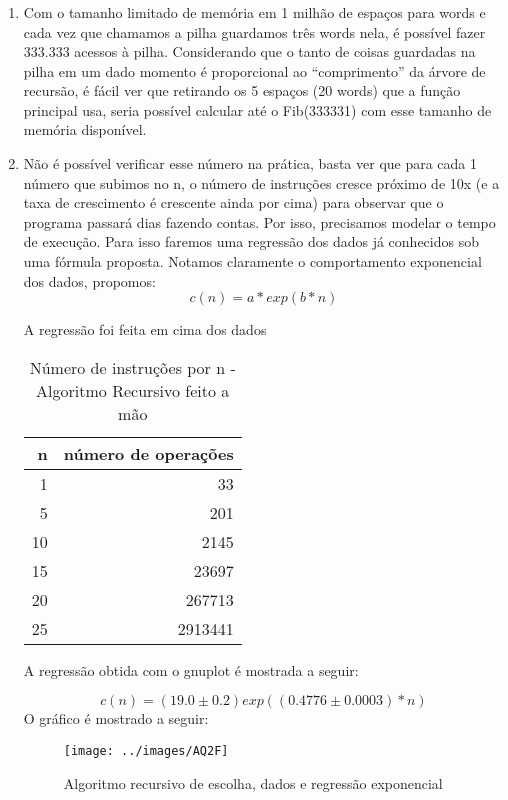         \subsubsection{}
        \begin{enumerate}
        \item Com o tamanho limitado de memória em 1 milhão de espaços para words e cada vez que chamamos a pilha guardamos três words nela, é possível fazer 333.333 acessos à pilha. Considerando que o tanto de coisas guardadas na pilha em um dado momento é proporcional ao “comprimento” da árvore de recursão, é fácil ver que retirando os 5 espaços (20 words) que a função principal usa, seria possível calcular até o Fib(333331) com esse tamanho de memória disponível.
        
        \item Não é possível verificar esse número na prática, basta ver que para cada 1 número que subimos no n, o número de instruções cresce próximo de 10x (e a taxa de crescimento é crescente ainda por cima) para observar que o programa passará dias fazendo contas.
Por isso, precisamos modelar o tempo de execução. Para isso faremos uma regressão
dos dados já conhecidos sob uma fórmula proposta. Notamos claramente o comportamento exponencial dos dados, propomos:
\begin{equation}
        c(n) = a*exp(b*n)
\end{equation}

A regressão foi feita em cima dos dados
\begin{table}[H]
	\centering 
	\begin{tabular}{|r|r|} \hline
	n        & número de operações \\ \hline
	1&		33		\\ \hline
5	&	201\\ \hline
10	&	2145		\\ \hline
15	&	23697		\\ \hline
20	&	267713\\ \hline
25	&	2913441 \\ \hline
	\end{tabular}
	\caption{Número de instruções por n - Algoritmo Recursivo feito a mão}
	\label{tab:}
\end{table}

A regressão obtida com o gnuplot é mostrada a seguir:

\begin{equation}
        c(n) = ( 19.0 \pm   0.2)exp((0.4776 \pm  0.0003)*n)
\end{equation}
O gráfico é mostrado a seguir:
         \begin{figure}[H]
                 \centering
                 \texttt{[image: ../images/AQ2F]}
                \caption{Algoritmo recursivo de escolha, dados e regressão exponencial}
         \end{figure}


\end{enumerate}
